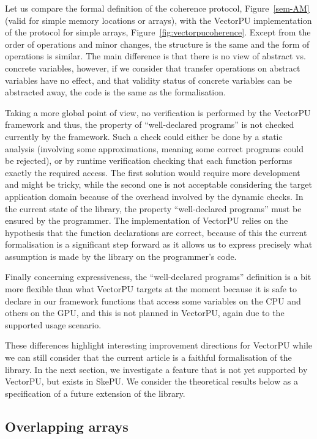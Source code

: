 \documentclass[preprint,12pt]{elsarticle}
\begin{document}
Let us compare the formal definition of the coherence protocol, Figure~\ref{sem-AM} (valid for simple memory locations or arrays), with the VectorPU implementation of the protocol for simple arrays, Figure~\ref{fig:vectorpucoherence}. Except from the order of operations and minor changes, the structure is the same and the form of operations is similar. The main difference is that there is no view of abstract vs. concrete variables, however, if we consider that transfer operations on abstract variables have no effect, and that validity status of concrete variables can be abstracted away, the code is  the same as the formalisation. 

Taking a more global point of view, no verification is performed by the VectorPU framework and thus, the property of ``well-declared programs'' is not checked currently by the framework. Such a check could either be done by a static analysis (involving some approximations, meaning  some correct programs could be rejected), or by runtime verification checking that each function performs exactly the required access. The first solution would require more development and might be tricky, while the second one is not acceptable considering the target application domain because of the overhead involved by the dynamic checks. In the current state of the library, the property ``well-declared programs''  must be ensured by the programmer. The implementation of VectorPU relies on the hypothesis that the function declarations are correct, because of this the current formalisation is a significant step forward as it allows us to express precisely what assumption is made by the library on the programmer's code.

Finally concerning expressiveness, the ``well-declared programs'' definition is a bit more flexible than what VectorPU targets at the moment because it is safe to declare in our framework functions that access some variables on the CPU and others on the GPU, and this is not planned in VectorPU, again due to the supported usage scenario.

These differences highlight interesting improvement directions for VectorPU while we can still consider that the current article  is a faithful formalisation of the library. In the next section, we investigate a feature that is not yet supported by VectorPU, but exists in SkePU. We consider the theoretical results below as a specification of a future extension of the library.

\subsection{Overlapping arrays}
\end{document}
